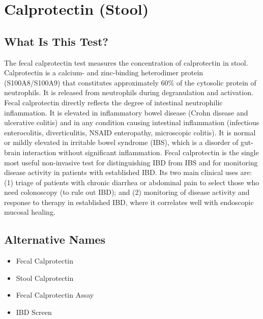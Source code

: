 \chapter{Calprotectin (Stool)}

\section*{What Is This Test?}
The fecal calprotectin test measures the concentration of calprotectin in stool. Calprotectin is a calcium- and zinc-binding heterodimer protein (S100A8/S100A9) that constitutes approximately 60\% of the cytosolic protein of neutrophils. It is released from neutrophils during degranulation and activation. Fecal calprotectin directly reflects the degree of intestinal neutrophilic inflammation. It is elevated in inflammatory bowel disease (Crohn disease and ulcerative colitis) and in any condition causing intestinal inflammation (infectious enterocolitis, diverticulitis, NSAID enteropathy, microscopic colitis). It is normal or mildly elevated in irritable bowel syndrome (IBS), which is a disorder of gut-brain interaction without significant inflammation. Fecal calprotectin is the single most useful non-invasive test for distinguishing IBD from IBS and for monitoring disease activity in patients with established IBD. Its two main clinical uses are: (1) triage of patients with chronic diarrhea or abdominal pain to select those who need colonoscopy (to rule out IBD); and (2) monitoring of disease activity and response to therapy in established IBD, where it correlates well with endoscopic mucosal healing.

\section*{Alternative Names}
\begin{itemize}
  \item Fecal Calprotectin
  \item Stool Calprotectin
  \item Fecal Calprotectin Assay
  \item IBD Screen
\end{itemize}

